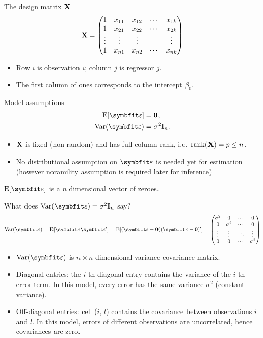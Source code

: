 \begin{frame}{The design matrix $\mathbf{X}$}
    \[
    \mathbf{X} = \begin{pmatrix}
        1 & x_{11} & x_{12} & \cdots & x_{1k} \\
        1 & x_{21} & x_{22} & \cdots & x_{2k} \\
        \vdots & \vdots & \vdots & & \vdots \\
        1 & x_{n1} & x_{n2} & \cdots & x_{nk}
    \end{pmatrix}
    \]
    \begin{itemize}
        \item Row $i$ is observation $i$; column $j$ is regressor $j$.
        \item The first column of ones corresponds to the intercept $\beta_0$.
    \end{itemize}
\end{frame}


\begin{frame}{Model assumptions}
    \begin{align}
        \E[\bvarepsilon] &= \bzero, \label{eq:assump-mean}\\
        \Var(\bvarepsilon) &= \sigma^2\bI_n. \label{eq:assump-var}
    \end{align}
    \begin{itemize}
        \item $\mathbf{X}$ is fixed (non-random) and has full column rank, i.e.\ $\operatorname{rank}(\mathbf{X})=p\le n$.
        \item No distributional assumption on $\bvarepsilon$ is needed yet for estimation (however noramility assumption is required later for inference)
    \end{itemize}
    \svspace{0.5em}
    \(\E[\bvarepsilon]\) is a \(n\) dimensional vector of zeroes.
\end{frame}


\begin{frame}{What does $\Var(\bvarepsilon)=\sigma^2\bI_n$ say?}
    \[
    \Var(\bvarepsilon) = \E[\bvarepsilon\bvarepsilon'] = \E[(\bvarepsilon - \bzero) (\bvarepsilon - \bzero)'] = 
    \begin{pmatrix}
        \sigma^2 & 0 & \cdots & 0 \\
        0 & \sigma^2 & \cdots & 0 \\
        \vdots & \vdots & \ddots & \vdots \\
        0 & 0 & \cdots & \sigma^2
    \end{pmatrix}
    \]
    \begin{itemize}
        \item \(\Var(\bvarepsilon)\) is \(n \times n\) dimensional variance-covariance matrix.
        \item Diagonal entries: the $i$-th diagonal entry contains the variance of the $i$-th error term. In this model, every error has the same variance $\sigma^2$ (constant variance).
        \item Off-diagonal entries: cell ($i$, $l$) contains the covariance between observations $i$ and $l$. In this model, errors of different observations are uncorrelated, hence covariances are zero.
    \end{itemize}
\end{frame}


